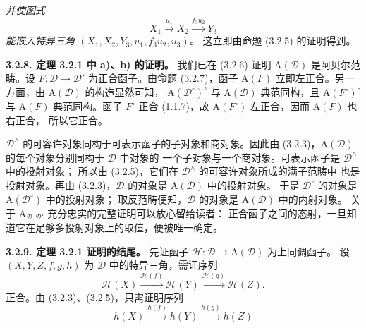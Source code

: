 \clearpage
{}%
\begingroup\small\setlength{\parskip}{0pt}\setlength{\emergencystretch}{1.5em}
\noindent\textit{并使图式}
\[
X_1\xrightarrow{u_1}X_2\xrightarrow{f_3u_2}Y_3
\]
\textit{能嵌入特异三角 $(X_1,X_2,Y_3,u_1,f_3u_2,u_3)$。}
这立即由命题 (3.2.5) 的证明得到。

\medskip\noindent\textbf{3.2.8. 定理 3.2.1 中 a)、b) 的证明。}\quad
我们已在 (3.2.6) 证明 $\mathrm A(\mathcal D)$ 是阿贝尔范畴。设
$F\colon\mathcal D\to\mathcal D'$ 为正合函子。由命题 (3.2.7)，函子
$\mathrm A(F)$ 立即左正合。另一方面，由 $\mathrm A(\mathcal D)$ 的构造显然可知，
$\mathrm A(\mathcal D^\circ)^\circ$ 与 $\mathrm A(\mathcal D)$ 典范同构，且
$\mathrm A(F^\circ)^\circ$ 与 $\mathrm A(F)$ 典范同构。函子 $F^\circ$ 正合
(1.1.7)，故 $\mathrm A(F^\circ)$ 左正合，因而 $\mathrm A(F)$ 也右正合，
所以它正合。

$\mathcal D^\wedge$ 的可容许对象同构于可表示函子的子对象和商对象。因此由
(3.2.3)，$\mathrm A(\mathcal D)$ 的每个对象分别同构于 $\mathcal D$ 中对象的
一个子对象与一个商对象。可表示函子是 $\mathcal D^\wedge$ 中的投射对象；
所以由 (3.2.5)，它们在 $\mathcal D^\wedge$ 的可容许对象所成的满子范畴中
也是投射对象。再由
(3.2.3)，$\mathcal D$ 的对象是 $\mathrm A(\mathcal D)$ 中的投射对象。
于是 $\mathcal D^\circ$ 的对象是 $\mathrm A(\mathcal D^\circ)$ 中的投射对象；
取反范畴便知，$\mathcal D$ 的对象是 $\mathrm A(\mathcal D)$ 中的内射对象。
关于 $\mathrm A_{\mathcal D,\mathcal D'}$ 充分忠实的完整证明可以放心留给读者：
正合函子之间的态射，一旦知道它在足够多投射对象上的取值，便被唯一确定。

\medskip\noindent\textbf{3.2.9. 定理 3.2.1 证明的结尾。}
先证函子 $\mathcal H\colon\mathcal D\to\mathrm A(\mathcal D)$ 为上同调函子。
设 $(X,Y,Z,f,g,h)$ 为 $\mathcal D$ 中的特异三角，需证序列
\[
\mathcal H(X)\xrightarrow{\mathcal H(f)}\mathcal H(Y)
\xrightarrow{\mathcal H(g)}\mathcal H(Z).
\]
正合。由 (3.2.3)、(3.2.5)，只需证明序列
\[
h(X)\xrightarrow{h(f)}h(Y)\xrightarrow{h(g)}h(Z)
\tag{3.2.9.1}
\]
\endgroup
